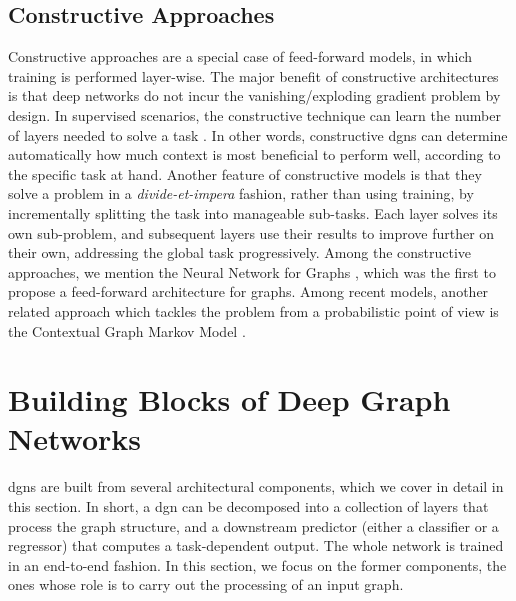 \subsection{Constructive Approaches}
Constructive approaches are a special case of feed-forward models, in which training is performed layer-wise. The major benefit of constructive architectures is that deep networks do not incur the vanishing/exploding gradient problem by design. In supervised scenarios, the constructive technique can learn the number of layers needed to solve a task \cite{?}. In other words, constructive \glspl{dgn} can determine automatically how much context is most beneficial to perform well, according to the specific task at hand. Another feature of constructive models is that they solve a problem in a \emph{divide-et-impera} fashion, rather than using  training, by incrementally splitting the task into manageable sub-tasks. Each layer solves its own sub-problem, and subsequent layers use their results to improve further on their own, addressing the global task progressively. Among the constructive approaches, we mention the Neural Network for Graphs \cite{?}, which was the first to propose a feed-forward architecture for graphs. Among recent models, another related approach which tackles the problem from a probabilistic point of view is the Contextual Graph Markov Model \cite{?}.

\section{Building Blocks of Deep Graph Networks}
\glspl{dgn} are built from several architectural components, which we cover in detail in this section. In short, a \gls{dgn} can be decomposed into a collection of layers that process the graph structure, and a downstream predictor (either a classifier or a regressor) that computes a task-dependent output. The whole network is trained in an end-to-end fashion. In this section, we focus on the former components, the ones whose role is to carry out the processing of an input graph.


